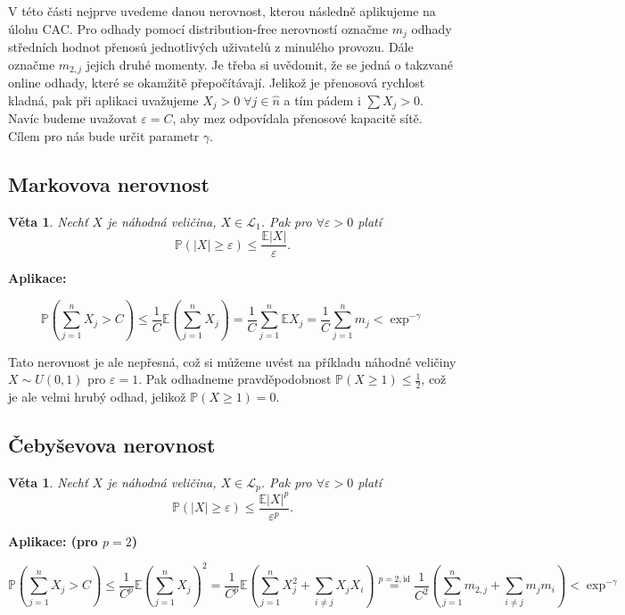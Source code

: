 \documentclass{article}
\newtheorem{theorem}[subsubsection]{Věta}
\theoremstyle{remark}
\theoremstyle{plain}
\theoremstyle{definition}
\theoremstyle{remark}
\begin{document}
V této části nejprve uvedeme danou nerovnost, kterou následně aplikujeme na úlohu CAC.
Pro odhady pomocí distribution-free nerovností označme $m_j$ odhady středních hodnot přenosů jednotlivých uživatelů z minulého provozu. Dále označme $m_{2,j}$ jejich druhé momenty. Je třeba si uvědomit, že se jedná o takzvané online odhady, které se okamžitě přepočítávají. Jelikož je přenosová rychlost kladná, pak při aplikaci uvažujeme $X_j > 0 \; \forall j \in \hat{n}$ a tím pádem i  $\sum X_j > 0$. Navíc budeme uvažovat $\varepsilon = C$, aby mez odpovídala přenosové kapacitě sítě. Cílem pro nás bude určit parametr $\gamma$.

\subsection{Markovova nerovnost}
\begin{theorem}
Nechť $X$ je náhodná veličina, $X \in \mathscr{L}_1$. Pak pro $\forall \varepsilon > 0$ platí 
$$
\mathbb{P}\left( |X| \geq \varepsilon \right)  \leq \frac{\mathbb{E} |X|}{\varepsilon}.
$$
\end{theorem}


\textbf{Aplikace:}

$$
\mathbb{P}\left( \sum_{j=1}^{n} X_j > C \right) \leq \frac{1}{C}\mathbb{E} \left( \sum_{j=1}^{n} X_j \right) = \frac{1}{C}\sum_{j=1}^{n} \mathbb{E} X_j = \frac{1}{C}\sum_{j=1}^{n} m_j < \exp^{-\gamma}
$$

Tato nerovnost je ale nepřesná, což si můžeme uvést na příkladu náhodné veličiny $X \sim U(0,1)$ pro $\varepsilon = 1$. Pak odhadneme pravděpodobnost $\mathbb{P}\left(X \geq 1\right) \leq \frac{1}{2}$, což je ale velmi hrubý odhad, jelikož $\mathbb{P}\left(X \geq 1\right) = 0$.

\subsection{Čebyševova nerovnost}
\begin{theorem}
Nechť $X$ je náhodná veličina, $X \in \mathscr{L}_p$. Pak pro $\forall \varepsilon > 0$ platí 
$$
\mathbb{P}\left( |X| \geq \varepsilon \right)  \leq \frac{\mathbb{E} |X|^{p}}{\varepsilon^{p}}.
$$
\end{theorem}

\textbf{Aplikace: (pro $p = 2$)}

$$
\mathbb{P}\left( \sum_{j=1}^{n} X_j > C \right) \leq \frac{1}{C^{p}} \mathbb{E} \left( \sum_{j=1}^{n} X_j \right)^{2} = \frac{1}{C^{p}} \mathbb{E} \left( \sum_{j=1}^{n} X_j^{2} + \sum_{i \neq j} X_j X_i \right) \stackrel{p=2,\text{id}}{=} \frac{1}{C^{2}} \left( \sum_{j=1}^{n} m_{2,j} + \sum_{i \neq j}m_{j}m_{i}\right) < \exp^{-\gamma}
$$
\end{document}
